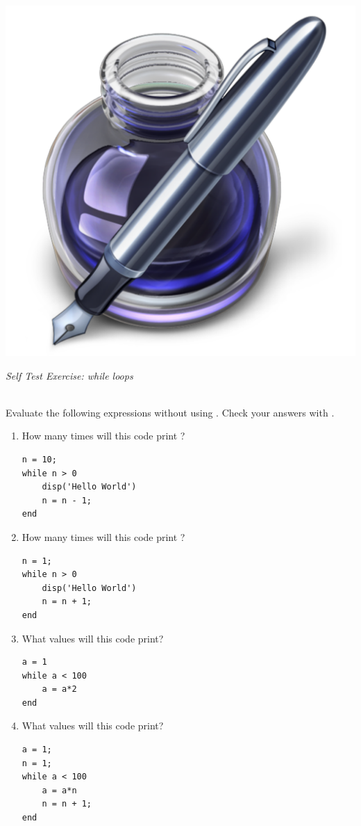 \addtolength{\parindent}{-4mm}
\begin{minipage}{\linewidth}
\begin{minipage}{6mm}
\includegraphics[scale=0.035]{Graphics/General/exercise_icon}
\end{minipage}
\textit{Self Test Exercise: while loops}
\end{minipage}
\addtolength{\parindent}{4mm}
\\ Evaluate the following expressions without using \mlab. Check your answers with \mlab.
\begin{enumerate}
\item How many times will this code print ?
\begin{lstlisting}
n = 10;
while n > 0
	disp('Hello World')
	n = n - 1;
end
\end{lstlisting}

\item How many times will this code print ?
\begin{lstlisting}
n = 1;
while n > 0
	disp('Hello World')
	n = n + 1;
end
\end{lstlisting}

\item What values will this code print?
\begin{lstlisting}
a = 1
while a < 100
	a = a*2
end
\end{lstlisting}

\newpage
\item What values will this code print?
\begin{lstlisting}
a = 1;
n = 1;
while a < 100
	a = a*n
	n = n + 1;
end
\end{lstlisting}
\end{enumerate}

